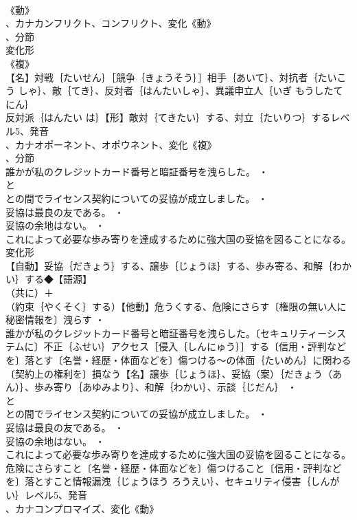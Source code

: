 \documentclass[8pt]{extreport}
\begin{document}
\begin{CJK}{UTF8}{min}
\\	《動》
\\	、カナカンフリクト、コンフリクト、変化《動》
\\	、分節
\\	変化形 
\\	《複》
\\	【名】対戦｛たいせん｝［競争｛きょうそう｝］相手｛あいて｝、対抗者｛たいこう しゃ｝、敵｛てき｝、反対者｛はんたいしゃ｝、異議申立人｛いぎ もうしたてにん｝
\\	反対派｛はんたい は｝【形】敵対｛てきたい｝する、対立｛たいりつ｝するレベル5、発音
\\	、カナオポーネント、オポウネント、変化《複》
\\	、分節
\\	誰かが私のクレジットカード番号と暗証番号を洩らした。 ・
\\	と
\\	との間でライセンス契約についての妥協が成立しました。 ・
\\	妥協は最良の友である。 ・
\\	妥協の余地はない。 ・
\\	これによって必要な歩み寄りを達成するために強大国の妥協を図ることになる。	変化形 
\\	【自動】妥協｛だきょう｝する、譲歩｛じょうほ｝する、歩み寄る、和解｛わかい｝する◆【語源】
\\	（共に）＋
\\	（約束｛やくそく｝する）【他動】危うくする、危険にさらす〔権限の無い人に秘密情報を〕洩らす ・
\\	誰かが私のクレジットカード番号と暗証番号を洩らした。〔セキュリティーシステムに〕不正｛ふせい｝アクセス［侵入｛しんにゅう｝］する〔信用・評判などを〕落とす〔名誉・経歴・体面などを〕傷つける～の体面｛たいめん｝に関わる〔契約上の権利を〕損なう【名】譲歩｛じょうほ｝、妥協（案）｛だきょう（あん）｝、歩み寄り｛あゆみより｝、和解｛わかい｝、示談｛じだん｝ ・
\\	と
\\	との間でライセンス契約についての妥協が成立しました。 ・
\\	妥協は最良の友である。 ・
\\	妥協の余地はない。 ・
\\	これによって必要な歩み寄りを達成するために強大国の妥協を図ることになる。危険にさらすこと〔名誉・経歴・体面などを〕傷つけること〔信用・評判などを〕落とすこと情報漏洩｛じょうほう ろうえい｝、セキュリティ侵害｛しんがい｝レベル5、発音
\\	、カナコンプロマイズ、変化《動》

\end{CJK}
\end{document}
